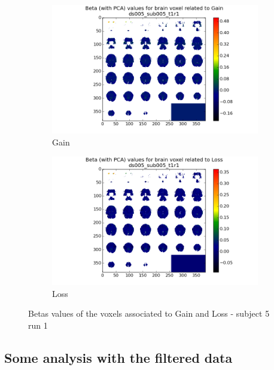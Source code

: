 \begin{figure}[H]
\begin{subfigure}{.5\textwidth}
  \centering
  \includegraphics[width=.95\linewidth]{../fig/mosaic/ds005_sub005_t1r1_withPCA_Gain.png}
  \caption{Gain}
  \label{fig:fig1}
\end{subfigure}%
\begin{subfigure}{.5\textwidth}
  \centering
  \includegraphics[width=.95\linewidth]{../fig/mosaic/ds005_sub005_t1r1_withPCA_Loss.png}
  \caption{Loss}
  \label{fig:fig2}
\end{subfigure}
\caption{Betas values of the voxels associated to Gain and Loss - subject 5 run 1}
\label{fig:figa}
\end{figure}

\subsection{Some analysis with the filtered data}

